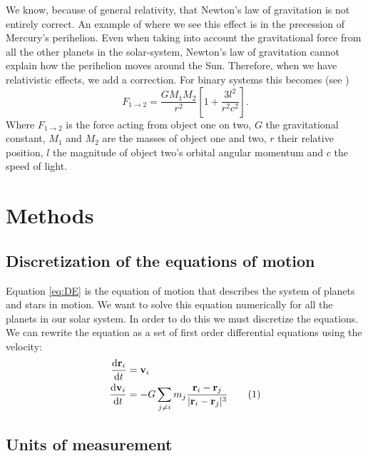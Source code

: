 \documentclass[reprint, english,notitlepage,nofootinbib]{revtex4-1}  %
\newcommand\numberthis{\addtocounter{equation}{1}\tag{\theequation}}
\newcommand{\vc}[1]{\mathbf{#1}}
\begin{document}
We know, because of general relativity, that Newton's law of gravitation is not entirely correct. An example of where we see this effect is in the precession of Mercury's perihelion. Even when taking into account the gravitational force from all the other planets in the solar-system, Newton's law of gravitation cannot explain how the perihelion moves around the Sun. Therefore, when we have relativistic effects, we add a correction. For binary systems this becomes (see \citep{oppgavetekst})
\begin{equation}
	\label{eq:general_relativity}
	F_{1 \rightarrow 2} = \frac{GM_1M_2}{r^2}\left[ 1 + \frac{3l^2}{r^2c^2} \right].
\end{equation}
Where $F_{1 \rightarrow 2}$ is the force acting from object one on two, $G$ the gravitational constant, $M_1$ and $M_2$ are the masses of object one and two, $r$ their relative position, $l$ the magnitude of object two's orbital angular momentum and $c$ the speed of light.



\section{Methods}

\subsection{Discretization of the equations of motion}

Equation \eqref{eq:DE} is the equation of motion that describes the system of planets and stars in motion. We want to solve this equation numerically for all the planets in our solar system. In order to do this we must discretize the equations. We can rewrite the equation as a set of first order differential equations using the velocity:
\begin{align*}
   \frac{\mathrm d \vc r_i}{\mathrm d t} &= \vc v_i \\
   \frac{\mathrm d \vc v_i}{\mathrm d t} &= - G \sum_{j \neq i} m_j \frac{\vc r_i - \vc r_j}{ \lvert \vc r_i - \vc r_j \rvert ^3} \numberthis \label{eq:eq_of_motion}
\end{align*}


\subsection{Units of measurement}
\end{document}
